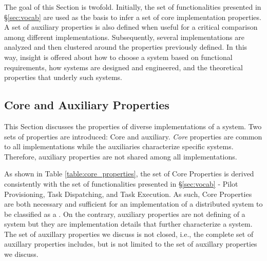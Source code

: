 \documentclass{sig-alternate}
\begin{document}
The goal of this Section is twofold.  Initially, the set of
functionalities presented in \S\ref{sec:vocab} are used as the basis
to infer a set of core implementation properties. A set of auxiliary
properties is also defined when useful for a critical comparison among
different \pilotjob implementations. Subsequently, several \pilotjob
implementations are analyzed and then clustered around the properties
previously defined. In this way, insight is offered about how to
choose a \pilotjob system based on functional requirements, how
\pilotjob systems are designed and engineered, and the theoretical
properties that underly such systems.






\subsection{Core and Auxiliary Properties}

This Section discusses the properties of diverse implementations of a \pilotjob
system. Two sets of properties are introduced: Core and auxiliary.
\textit{Core} properties are common to all \pilotjob implementations while the
auxiliaries characterize specific \pilotjob systems. Therefore, auxiliary
properties are not shared among all \pilotjob implementations.

As shown in Table \ref{table:core_properties}, the set of Core Properties is
derived consistently with the set of functionalities presented in
\S\ref{sec:vocab} - Pilot Provisioning, Task Dispatching, and Task Execution.
As such, Core Properties are both necessary and sufficient for an
implementation of a distributed system to be classified as a \pilotjob. On the
contrary, auxiliary properties are not defining of a \pilotjob system but they
are implementation details that further characterize a \pilotjob system.  The
set of auxillary properties we discuss is not closed, i.e., the complete set of
auxillary properties includes, but is not limited to the set of auxillary
properties we discuss.
\end{document}
